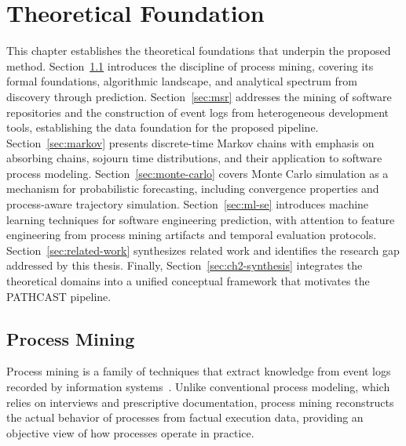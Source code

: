 
\chapter{Theoretical Foundation}
\label{ch:theoretical-foundation}

This chapter establishes the theoretical foundations that underpin the proposed
method. Section~\ref{sec:process-mining} introduces the discipline of process
mining, covering its formal foundations, algorithmic landscape, and analytical
spectrum from discovery through prediction.
Section~\ref{sec:msr} addresses the mining of software repositories and the
construction of event logs from heterogeneous development tools, establishing
the data foundation for the proposed pipeline.
Section~\ref{sec:markov} presents discrete-time Markov chains with emphasis
on absorbing chains, sojourn time distributions, and their application to
software process modeling. Section~\ref{sec:monte-carlo} covers Monte Carlo
simulation as a mechanism for probabilistic forecasting, including convergence
properties and process-aware trajectory simulation.
Section~\ref{sec:ml-se} introduces machine learning techniques for software
engineering prediction, with attention to feature engineering from process
mining artifacts and temporal evaluation protocols.
Section~\ref{sec:related-work} synthesizes related work and identifies the
research gap addressed by this thesis. Finally,
Section~\ref{sec:ch2-synthesis} integrates the theoretical domains into a
unified conceptual framework that motivates the PATHCAST pipeline.


\section{Process Mining}
\label{sec:process-mining}

Process mining is a family of techniques that extract knowledge from event
logs recorded by information systems~\cite{aalst2016process}. Unlike
conventional process modeling, which relies on interviews and prescriptive
documentation, process mining reconstructs the actual behavior of processes
from factual execution data, providing an objective view of how processes
operate in practice.

